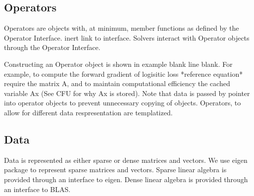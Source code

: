 \subsection{Operators}

Operators are objects with, at minimum, member functions as defined by the Operator Interface.
inert link to interface.
Solvers interact with Operator objects through the Operator Interface.

Constructing an Operator object is shown in example blank line blank.
For example, to compute the forward gradient of logisitic loss *reference equation* require the matrix A, and to maintain computational efficiency the cached variable Ax (See CFU for why Ax is stored). Note that data is passed by pointer into operator objects to prevent unnecessary copying of objects.  
Operators, to allow for different data respresentation are templatized.

\subsection{Data}

Data is represented as either sparse or dense matrices and vectors.
We use eigen package to represent sparse matrices and vectors. 
Sparse linear algebra is provided through an interface to eigen.
Dense linear algebra is provided through an interface to BLAS. 





